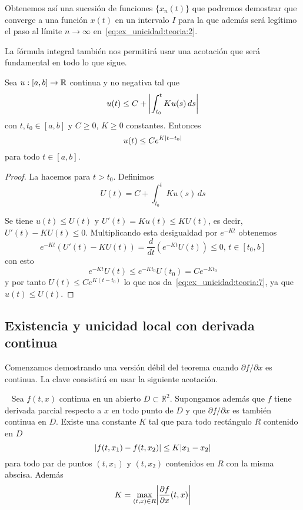 \documentclass[../ecuaciones_diferenciales.tex]{subfiles}
\begin{document}
Obtenemos así una sucesión de funciones \(\{x_n(t)\}\) que podremos demostrar que converge a una función
\(x(t)\) en un intervalo \(I\) para la que además será legítimo el paso al 
límite \(n \to \infty\) en~\ref{eq:ex_unicidad:teoria:2}. 

La fórmula integral también nos permitirá usar una acotación que será fundamental en todo lo que sigue.

\begin{lemma}\label{lemma:ex_unicidad:teoria:gronwall}
    Sea \(u : [a, b] \to \mathbb{R}\) continua y no negativa tal que
    \begin{equation}
        u(t) \leq C + \abs{\int_{t_0}^t K u(s) \, ds}
    \end{equation}
    con \(t, t_0 \in [a, b]\) y \(C \geq 0\), \(K \geq 0\) constantes.
    Entonces 
    \begin{equation}\label{eq:ex_unicidad:teoria:7}
        u(t) \leq C e^{K \abs{t - t_0}}
    \end{equation}
    para todo \(t \in [a, b]\).
\end{lemma}

\begin{proof}
    La hacemos para \(t > t_0\). Definimos 
    \[
        U(t) = C + \int_{t_0}^t K u(s) \, ds
    \]

    Se tiene \(u(t) \leq U(t)\) y \(U'(t) = K u(t) \leq K U(t)\), es decir, 
    \(U'(t) - K U(t) \leq 0\). Multiplicando esta desigualdad por \(e^{-Kt}\) obtenemos
    \[
        e^{-Kt} (U'(t) - K U(t)) = \frac{d}{dt} (e^{-Kt} U(t)) \leq 0, \, t \in [t_0, b]
    \]
    con esto
    \[
        e^{-Kt} U(t) \leq e^{-Kt_0} U(t_0) = C e^{-Kt_0}
    \]
    y por tanto \(U(t) \leq C e^{K(t - t_0)}\) lo que nos da~\ref{eq:ex_unicidad:teoria:7}, ya que \(u(t) \leq U(t)\).
\end{proof}

\subsection{Existencia y unicidad local con derivada continua}

Comenzamos demostrando una versión débil del teorema cuando \(\partial f / \partial x\) es continua.
La clave consistirá en usar la siguiente acotación.

\begin{lemma}~\label{lemma:ex_unicidad:teoria:acotacion}
    Sea \(f(t, x)\) continua en un abierto \(D \subset \mathbb{R}^2\). Supongamos además que \(f\) tiene derivada parcial respecto a \(x\) en todo punto de \(D\)
    y que \(\partial f / \partial x\) es también continua en \(D\). Existe una constante \(K\) tal que para todo rectángulo \(R\) contenido en \(D\)
    \begin{equation}
        \abs{f(t, x_1) - f(t, x_2)} \leq K \abs{x_1 - x_2} 
    \end{equation}
    para todo par de puntos \((t, x_1)\) y \((t, x_2)\) contenidos en \(R\) con la misma abscisa. Además
    \[
        K = \max_{(t, x) \in R} \abs{\frac{\partial f}{\partial x}(t, x)}
    \]
\end{lemma}
\end{document}
